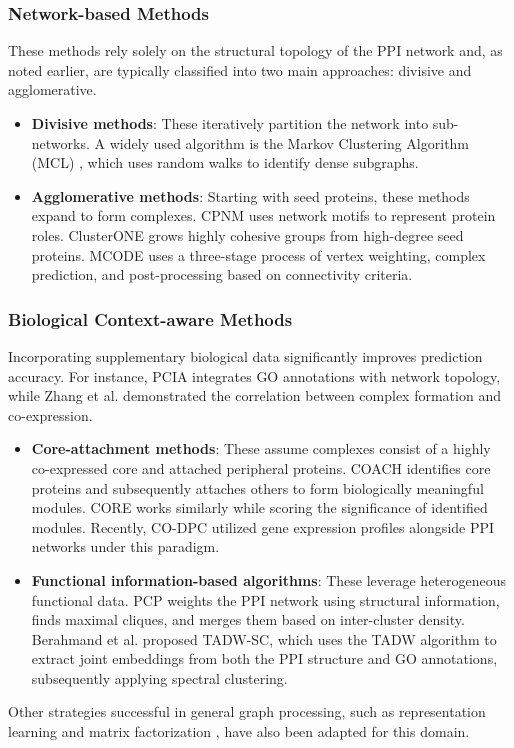 \subsubsection{Network-based Methods}
These methods rely solely on the structural topology of the PPI network and, as noted earlier, are typically classified into two main approaches: divisive and agglomerative.
\begin{itemize}
	\item \textbf{Divisive methods}: These iteratively partition the network into sub-networks. A widely used algorithm is the Markov Clustering Algorithm (MCL) \cite{2012markov}, which uses random walks to identify dense subgraphs.
	\item \textbf{Agglomerative methods}: Starting with seed proteins, these methods expand to form complexes. CPNM \cite{2020motif} uses network motifs to represent protein roles. ClusterONE \cite{2012clusterone} grows highly cohesive groups from high-degree seed proteins. MCODE \cite{2003mcode} uses a three-stage process of vertex weighting, complex prediction, and post-processing based on connectivity criteria.
\end{itemize}

\subsubsection{Biological Context-aware Methods}
Incorporating supplementary biological data significantly improves prediction accuracy. For instance, PCIA \cite{2013PCIA} integrates GO annotations with network topology, while Zhang et al. \cite{2019integrating} demonstrated the correlation between complex formation and co-expression.
\begin{itemize}
	\item \textbf{Core-attachment methods}: These assume complexes consist of a highly co-expressed core and attached peripheral proteins. COACH \cite{2009core} identifies core proteins and subsequently attaches others to form biologically meaningful modules. CORE \cite{2009predicting} works similarly while scoring the significance of identified modules. Recently, CO-DPC utilized gene expression profiles alongside PPI networks under this paradigm.
	\item \textbf{Functional information-based algorithms}: These leverage heterogeneous functional data. PCP \cite{2008PCP} weights the PPI network using structural information, finds maximal cliques, and merges them based on inter-cluster density. Berahmand et al. \cite{berahmand2021spectral} proposed TADW-SC, which uses the TADW algorithm \cite{yang2015network} to extract joint embeddings from both the PPI structure and GO annotations, subsequently applying spectral clustering. 
\end{itemize}
Other strategies successful in general graph processing, such as representation learning \cite{2019hierarchical, 2018embeding} and matrix factorization \cite{2020integrative}, have also been adapted for this domain.

